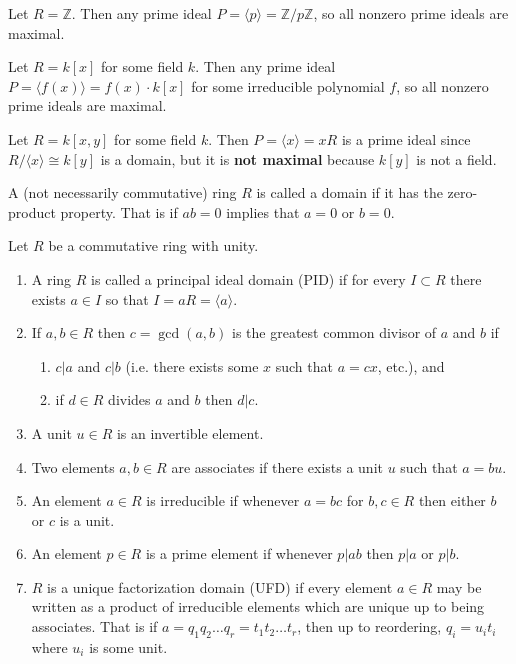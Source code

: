 \documentclass{article}
\newenvironment{definition}[1][Definition.]{
  \begin{trivlist} \item[\hskip \labelsep {\bfseries #1}]
}{\end{trivlist}}
\newenvironment{example}[1][Example.]{
  \begin{trivlist} \item[\hskip \labelsep {\bfseries #1}]
}{\end{trivlist}}
\newcommand{\ang}[1]{\langle #1 \rangle}
\begin{document}
\begin{example}
  Let $R = \mathbb Z$. Then any prime ideal
  $P = \ang{p} = \mathbb Z/p\mathbb Z$, so all nonzero prime ideals are maximal.
\end{example}
\begin{example}
  Let $R = k[x]$ for some field $k$. Then any prime ideal
  $P = \ang{f(x)} = f(x) \cdot k[x]$ for some irreducible polynomial $f$, so
  all nonzero prime ideals are maximal.
\end{example}
\begin{example}
  Let $R = k[x, y]$ for some field $k$. Then  $P = \ang{x} = xR$ is a prime
  ideal since $R/\ang{x} \cong k[y]$ is a domain, but it is \textbf{not maximal}
  because $k[y]$ is not a field.
\end{example}
\begin{definition}
  A (not necessarily commutative) ring $R$ is called a domain if it has the
  zero-product property. That is if $ab = 0$ implies that $a = 0$ or $b = 0$.
\end{definition}
\begin{definition}[Definitions.] Let $R$ be a commutative ring with unity.
  \begin{enumerate}
    \item A ring $R$ is called a principal ideal domain (PID) if for every
    $I \subset R$ there exists $a \in I$ so that $I = aR = \ang{a}$.
    \item If $a, b \in R$ then $c = \gcd(a, b)$ is the greatest common divisor
    of $a$ and $b$ if \begin{enumerate}
      \item $c | a$ and $c | b$ (i.e. there exists some $x$ such that $a = cx$, etc.), and
      \item if $d \in R$ divides $a$ and $b$ then $d | c$.
    \end{enumerate}
    \item A unit $u \in R$ is an invertible element.
    \item Two elements $a, b \in R$ are associates if there exists a unit $u$
    such that $a = bu$.
    \item An element $a \in R$ is irreducible if whenever $a = bc$ for
    $b, c \in R$ then either $b$ or $c$ is a unit.
    \item An element $p \in R$ is a prime element if whenever $p | ab$ then
    $p | a$ or $p | b$.
    \item $R$ is a unique factorization domain (UFD) if every element $a \in R$
    may be written as a product of irreducible elements which are unique up to
    being associates. That is if $a = q_1q_2 \hdots q_r = t_1t_2 \hdots t_r$,
    then up to reordering, $q_i = u_it_i$ where $u_i$ is some unit.
  \end{enumerate}
\end{definition}
\end{document}

